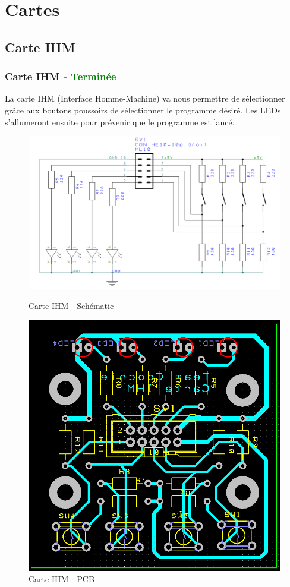 \section{Cartes}

\subsection{Carte IHM}
\begin{frame}
    \frametitle{Carte IHM - \textcolor{green}{Terminée}}
    La carte IHM (Interface Homme-Machine) va nous permettre de sélectionner grâce aux boutons poussoirs de sélectionner le programme désiré. Les LEDs s'allumeront ensuite pour prévenir que le programme est lancé.

    \vfill
    \begin{figure}[H]
        \centering
        \begin{minipage}{.5\textwidth}
            \centering
            \includegraphics[width=.7\linewidth]{Images/carteIHM_sch.png}
            \caption{Carte IHM - Schématic}
            \label{fig:ihmsch}
        \end{minipage}%
        \begin{minipage}{.5\textwidth}
            \centering
            \includegraphics[width=.5\linewidth]{Images/carteIHM_pcb.png}
            \caption{Carte IHM - PCB}
        \label{fig:ihmpcb}
        \end{minipage}
    \end{figure}

\footer{\hfill\insertframenumber/\inserttotalframenumber}
\end{frame}

